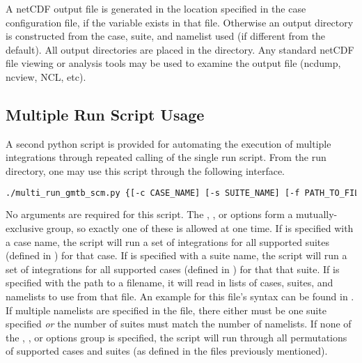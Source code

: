 A netCDF output file is generated in the location specified in the case
configuration file, if the  variable exists in that file. Otherwise an output directory is constructed from the case, suite, and namelist used (if different from the default). All output directories are placed in the  directory. Any standard netCDF file viewing or analysis tools may be used to
examine the output file (ncdump, ncview, NCL, etc).

\subsection{Multiple Run Script Usage}

A second python script is provided for automating the execution of multiple integrations through repeated calling of the single run script. From the run directory, one may use this script through the following interface.

\begin{lstlisting}[language=bash]
./multi_run_gmtb_scm.py {[-c CASE_NAME] [-s SUITE_NAME] [-f PATH_TO_FILE]} [-v{v}] [-t]
\end{lstlisting}

No arguments are required for this script. The , , or  options form a mutually-exclusive group, so exactly one of these is allowed at one time. If  is specified with a case name, the script will run a set of integrations for all supported suites (defined in ) for that case. If  is specified with a suite name, the script will run a set of integrations for all supported cases (defined in ) for that that suite. If  is specified with the path to a filename, it will read in lists of cases, suites, and namelists to use from that file. An example for this file's syntax can be found in . If multiple namelists are specified in the file, there either must be one suite specified \emph{or} the number of suites must match the number of namelists. If none of the , , or  options group is specified, the script will run through all permutations of supported cases and suites (as defined in the files previously mentioned).


